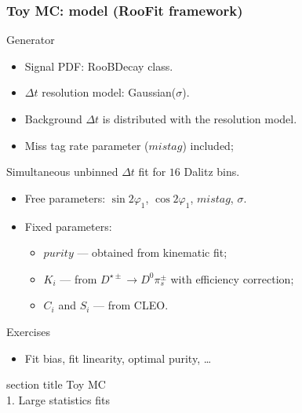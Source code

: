 \documentclass[10 pt,compress,mathserif]{beamer}
\begin{document}
\begin{frame}
 \frametitle{Toy MC: model (RooFit framework)}
 \begin{block}{Generator}
 \begin{itemize}
  \item Signal PDF: RooBDecay class.
  \item $\Delta t$ resolution model: Gaussian($\sigma$).
  \item Background $\Delta t$ is distributed with the resolution model.
  \item Miss tag rate parameter ($mistag$) included;
 \end{itemize}
 \end{block}
 
 \begin{block}{Simultaneous unbinned $\Delta t$ fit for $16$ Dalitz bins.}
 \begin{itemize}
  \item Free parameters: $\sin{2\varphi_1}$, $\cos{2\varphi_1}$, $mistag$, $\sigma$.
  \item Fixed parameters:
   \begin{itemize}
    \item $purity$ --- obtained from kinematic fit;
    \item $K_i$ --- from $D^{\star\pm}\to D^0\pi^{\pm}_s$ with efficiency correction;
    \item $C_i$ and $S_i$ --- from CLEO.
   \end{itemize}
  \end{itemize}
 \end{block}

 \begin{block}{Exercises}
  \begin{itemize}
   \item Fit bias, fit linearity, optimal purity, \dots
  \end{itemize}
 \end{block}
\end{frame}

\begin{frame}
 \centering
    \begin{beamercolorbox}[sep=8pt,center]{section title}
       Toy MC\\ 1. Large statistics fits
    \end{beamercolorbox}
\end{frame}
\end{document}
